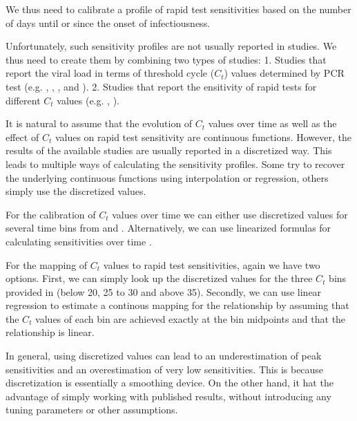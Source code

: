 We thus need to calibrate a profile of rapid test sensitivities based on the
number of days until or since the onset of infectiousness.

Unfortunately, such sensitivity profiles are not usually reported in studies. We
thus need to create them by combining two types of studies: 1. Studies that
report the viral load in terms of threshold cycle ($C_t$) values determined by
PCR test 
(e.g. \cite{Cosentino2022}
, \cite{Ong2021}, 
\cite{Bonnet2022},
\cite{Jang2021} and \cite{Zuin2021}
). 2. Studies that report the ensitivity of
rapid tests for different $C_t$ values 
(e.g. \cite{Scheiblauer2021},
\cite{Bruemmer2021}).


It is natural to assume that the evolution of $C_t$ values over time as well as
the effect of $C_t$ values on rapid test sensitivity are continuous functions.
However, the results of the available studies are usually reported in a
discretized way. This leads to multiple ways of calculating the sensitivity
profiles. Some try to recover the underlying continuous functions using
interpolation or regression, others simply use the discretized values.

For the calibration of $C_t$ values over time we can either use discretized
values for several time bins from \cite{Ong2021} and \cite{Jang2021}.
Alternatively, we can use linearized formulas for calculating sensitivities over
time \cite{Cosentino2022}.

For the mapping of $C_t$ values to rapid test sensitivities, again we have two
options. First, we can simply look up the discretized values for the three $C_t$
bins provided in \cite{Scheiblauer2021} (below 20, 25 to 30 and above 35).
Secondly, we can use linear regression to estimate a continous mapping for the
relationship by assuming that the $C_t$ values of each bin are achieved exactly
at the bin midpoints and that the relationship is linear.

In general, using discretized values can lead to an underestimation of peak
sensitivities and an overestimation of very low sensitivities. This is because
discretization is essentially a smoothing device. On the other hand, it hat the
advantage of simply working with published results, without introducing any
tuning parameters or other assumptions.


